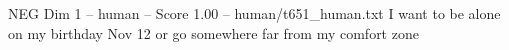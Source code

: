 \begin{textsample}{NEG Dim 1 – human – Score 1.00 – human/t651\_human.txt}  \label{ex:f1_neg_016}
I want to be alone on my birthday Nov 12 or go somewhere far from my comfort zone

\end{textsample}
